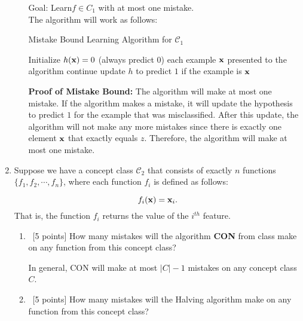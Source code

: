 \begin{enumerate}
\begin{enumerate}
  {\color{red}
    Goal: Learn$f \in C_1$ with at most one mistake. \\
    The algorithm will work as follows:

    \begin{algorithm}[H]
      \caption{Mistake Bound Learning Algorithm for $\mathcal{C}_1$}
      \begin{algorithmic}[1]
        \State Initialize $h({\bf x}) = 0$ (always predict $0$)
        \For each example ${\bf x}$ presented to the algorithm
        \State continue
        \EndIf
        \State update $h$ to predict $1$ if the example is ${\bf x}$
        \EndIf
        \EndFor
      \end{algorithmic}
    \end{algorithm}

    \textbf{Proof of Mistake Bound:} The algorithm will make at most one mistake. If the algorithm makes a mistake, it will update the hypothesis to predict $1$ for the example that was misclassified. After this update, the algorithm will not make any more mistakes since there is exactly one element ${\bf x}$ that exactly equals $z$. Therefore, the algorithm will make at most one mistake.
  }

  \end{enumerate}

\item Suppose we have a concept class $\mathcal{C}_2$ that consists
  of exactly $n$ functions $\{f_1, f_2, \cdots, f_n\}$, where each
  function $f_i$ is defined as follows:

  \begin{equation*}
    f_i({\bf x}) = {\bf x}_i.
  \end{equation*}
  That is, the function $f_i$ returns the value of the $i^{th}$
  feature.

  \begin{enumerate}
  \item~[5 points] How many mistakes will the algorithm
    \textbf{CON} from class make on any function from this concept
    class?

    {\color{red}
      In general, CON will make at most $|C|-1$ mistakes on any concept class $C$.\\

    }

  \item~[5 points] How many mistakes will the Halving algorithm make
    on any function from this concept class?
  \end{enumerate}

\end{enumerate}



